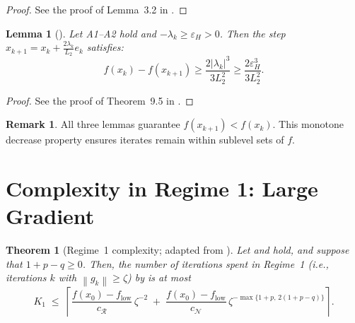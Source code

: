 \documentclass[11pt,a4paper]{article}
\theoremstyle{plain}
\newtheorem{theorem}{Theorem}
\newtheorem{lemma}{Lemma}
\theoremstyle{definition}
\newtheorem{remark}{Remark}
\newcommand{\norm}[1]{\left\|#1\right\|}
\newcommand{\flow}{f_{\mathrm{low}}}
\newcommand{\setN}{\mathcal{N}}
\newcommand{\setR}{\mathcal{R}}
\newcommand{\cN}{c_{\setN}}
\begin{document}
\begin{proof}
See the proof of Lemma~3.2 in \cite{RoyerChan2022}.
\end{proof}


\begin{lemma}[]
\label{lem:decrease_NCD}
Let A1--A2 hold and $-\lambda_k \geq \varepsilon_H > 0$. Then the step $x_{k+1} = x_k + \frac{2\lambda_k}{L_2}e_k$ satisfies:
\begin{equation}
\label{eq:decrease_NCD}
f(x_k) - f(x_{k+1}) \geq \frac{2|\lambda_k|^3}{3L_2^2} \geq \frac{2\varepsilon_H^3}{3L_2^2}.
\end{equation}
\end{lemma}
\begin{proof}
See the proof of Theorem~9.5 in \cite{WrightMa2022}.
\end{proof}

\begin{remark}
\label{rem:monotone}
All three lemmas guarantee $f(x_{k+1}) < f(x_k)$. This monotone decrease property ensures iterates remain within sublevel sets of $f$.
\end{remark}

\section{Complexity in Regime 1: Large Gradient}\label{sec:regime1}

\begin{theorem}[Regime~1 complexity; adapted from ]
\label{thm:regime1}
Let  and  hold, and suppose that $1 + p - q \geq 0$. Then, the number of iterations spent in Regime~1 (i.e., iterations $k$ with $\norm{g_{k}} \geq \zeta$) by  is at most
\begin{equation}\label{eq:K1-bound}
K_{1} \;\leq\;
\left\lceil
\frac{f(x_{0}) - \flow}{c_{\setR}}\,\zeta^{-2}
\;+\;
\frac{f(x_{0}) - \flow}{\cN}\,\zeta^{-\max\{1+p,\,2(1+p-q)\}}
\right\rceil.
\end{equation}
\end{theorem}
\end{document}
